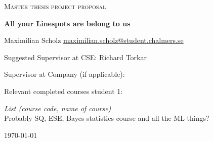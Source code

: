 \begin{titlepage}
  

\centering
  
  
{\scshape\LARGE Master thesis project proposal\\}
  
\vspace{0.5cm}
  
{\huge\bfseries All your Linespots are belong to us\\}
  
\vspace{2cm}
  
{\Large Maximilian Scholz \href{mailto:maximilian.scholz@student.chalmers.se}{maximilian.scholz@student.chalmers.se}\\}

\vspace{1.0cm}
  
{\large Suggested Supervisor at CSE: Richard Torkar\\}
  
\vspace{1.5cm}
  
{\large Supervisor at Company (if applicable): \\}
  
\vspace{1.5cm}
  
{\large Relevant completed courses student 1:\par}
  
{\itshape List (course code, name of course)\\}
Probably SQ, ESE, Bayes statistics course and all the ML things?
  
\vspace{1.5cm}
  
\vfill

  

\vfill
  
{\large \today\\} 


\end{titlepage}